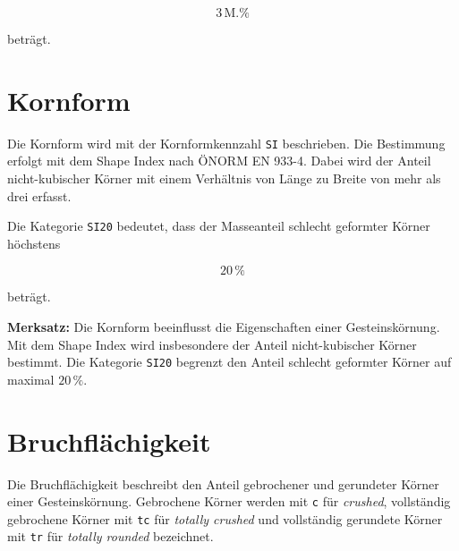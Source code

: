 \documentclass[
  12pt,
  a4paper,
  oneside
]{scrreprt}
\begin{document}
\begin{equation}
  3\,\mathrm{M.\%}
\end{equation}

beträgt. 

\section{Kornform}

Die Kornform wird mit der Kornformkennzahl \texttt{SI} beschrieben.
Die Bestimmung erfolgt mit dem Shape Index nach ÖNORM EN 933-4.
Dabei wird der Anteil nicht-kubischer Körner mit einem Verhältnis von
Länge zu Breite von mehr als drei erfasst. 

Die Kategorie \texttt{SI20} bedeutet, dass der Masseanteil schlecht
geformter Körner höchstens

\begin{equation}
  20\,\%
\end{equation}

beträgt. 

\begin{merksatzbox}
\textbf{Merksatz:}
Die Kornform beeinflusst die Eigenschaften einer Gesteinskörnung. Mit
dem Shape Index wird insbesondere der Anteil nicht-kubischer Körner
bestimmt. Die Kategorie \texttt{SI20} begrenzt den Anteil schlecht
geformter Körner auf maximal $20\,\%$.

\end{merksatzbox}

\section{Bruchflächigkeit}

Die Bruchflächigkeit beschreibt den Anteil gebrochener und gerundeter
Körner einer Gesteinskörnung. Gebrochene Körner werden mit
\texttt{c} für \textit{crushed}, vollständig gebrochene Körner mit
\texttt{tc} für \textit{totally crushed} und vollständig gerundete
Körner mit \texttt{tr} für \textit{totally rounded} bezeichnet.
\end{document}
